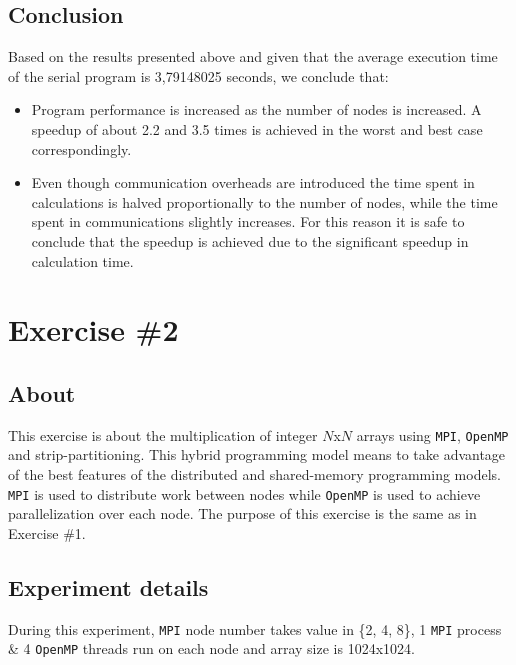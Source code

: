 \documentclass{article}
\begin{document}


\subsection{Conclusion}
Based on the results presented above and given that the average execution time of the serial
program is 3,79148025 seconds, we conclude that:

\begin{itemize}
 \item Program performance is increased as the number of nodes is increased. A speedup of
       about 2.2 and 3.5 times is achieved in the worst and best case correspondingly.
 \item Even though communication overheads are introduced the time spent in calculations
       is halved proportionally to the number of nodes, while the time spent in communications
       slightly increases. For this reason it is safe to conclude that the speedup is
       achieved due to the significant speedup in calculation time.
\end{itemize}

\newpage


\section{Exercise \#2}

\subsection{About}
This exercise is about the multiplication of integer $N$x$N$ arrays using \texttt{MPI},
\texttt{OpenMP} and strip-partitioning. This hybrid programming model means to take
advantage of the best features of the distributed and shared-memory programming models.
\texttt{MPI} is used to distribute work between nodes while \texttt{OpenMP} is used to
achieve parallelization over each node. The purpose of this exercise is the same
as in Exercise \#1.

\subsection{Experiment details}
During this experiment, \texttt{MPI} node number takes value in \{2, 4, 8\}, 1 \texttt{MPI}
process \& 4 \texttt{OpenMP} threads run on each node and array size is 1024x1024.
\end{document}
